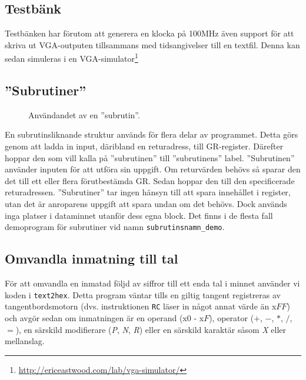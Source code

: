 \documentclass[]{article}
\begin{document}
\subsection{Testbänk}
Testbänken har förutom att generera en klocka på 100MHz även support för att skriva ut VGA-outputen tillsammans med tidsangivelser till en textfil. Denna kan sedan simuleras i en VGA-simulator\footnote{\href{http://ericeastwood.com/lab/vga-simulator/}{\url{http://ericeastwood.com/lab/vga-simulator/}}}

\newpage
\subsection{''Subrutiner''}
\begin{figure}[h!]
	\caption{Användandet av en ''subrutin''. }
\end{figure}
\noindent
En subrutinsliknande struktur används för flera delar av programmet. Detta görs genom att ladda in input, däribland en returadress, till GR-register. Därefter hoppar den som vill kalla på ''subrutinen'' till ''subrutinens'' label. ''Subrutinen'' använder inputen för att utföra sin uppgift. Om returvärden behövs så sparar den det till ett eller flera förutbestämda GR. Sedan hoppar den till den specificerade returadressen. ''Subrutiner'' tar ingen hänsyn till att spara innehållet i register, utan det är anroparens uppgift att spara undan om det behövs. Dock används inga platser i dataminnet utanför dess egna block. Det finns i de flesta fall demoprogram för subrutiner vid namn \texttt{subrutinsnamn\_demo}.

\subsection{Omvandla inmatning till tal}\label{sec:text2hex}
För att omvandla en inmatad följd av siffror till ett enda tal i minnet använder vi koden i \texttt{text2hex}. Detta program väntar tills en giltig tangent registreras av tangentbordsmotorn (dvs. instruktionen \texttt{RC} läser in något annat värde än x$FF$) och avgör sedan om inmatningen är en operand (x$0$ - x$F$), operator ($+$, $-$, $*$, $/$, $=$), en särskild modifierare (\textit{P}, \textit{N}, \textit{R}) eller en särskild karaktär såsom \textit{X} eller mellanslag.
\end{document}
